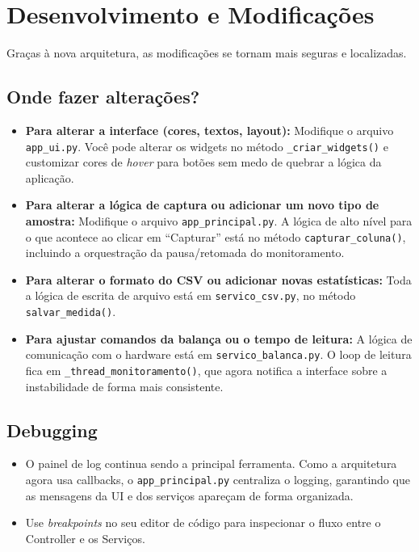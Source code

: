 \documentclass[12pt,a4paper]{article}
\begin{document}
\section{Desenvolvimento e Modificações}
Graças à nova arquitetura, as modificações se tornam mais seguras e localizadas.

\subsection{Onde fazer alterações?}
\begin{itemize}
    \item \textbf{Para alterar a interface (cores, textos, layout):}
    Modifique o arquivo \texttt{app\_ui.py}. Você pode alterar os widgets no método \texttt{\_criar\_widgets()} e customizar cores de \textit{hover} para botões sem medo de quebrar a lógica da aplicação.

    \item \textbf{Para alterar a lógica de captura ou adicionar um novo tipo de amostra:}
    Modifique o arquivo \texttt{app\_principal.py}. A lógica de alto nível para o que acontece ao clicar em ``Capturar'' está no método \texttt{capturar\_coluna()}, incluindo a orquestração da pausa/retomada do monitoramento.

    \item \textbf{Para alterar o formato do CSV ou adicionar novas estatísticas:}
    Toda a lógica de escrita de arquivo está em \texttt{servico\_csv.py}, no método \texttt{salvar\_medida()}.

    \item \textbf{Para ajustar comandos da balança ou o tempo de leitura:}
    A lógica de comunicação com o hardware está em \texttt{servico\_balanca.py}. O loop de leitura fica em \texttt{\_thread\_monitoramento()}, que agora notifica a interface sobre a instabilidade de forma mais consistente.
\end{itemize}

\subsection{Debugging}
\begin{itemize}
\item O painel de log continua sendo a principal ferramenta. Como a arquitetura agora usa callbacks, o \texttt{app\_principal.py} centraliza o logging, garantindo que as mensagens da UI e dos serviços apareçam de forma organizada.
\item Use \textit{breakpoints} no seu editor de código para inspecionar o fluxo entre o Controller e os Serviços.
\end{itemize}
\end{document}

